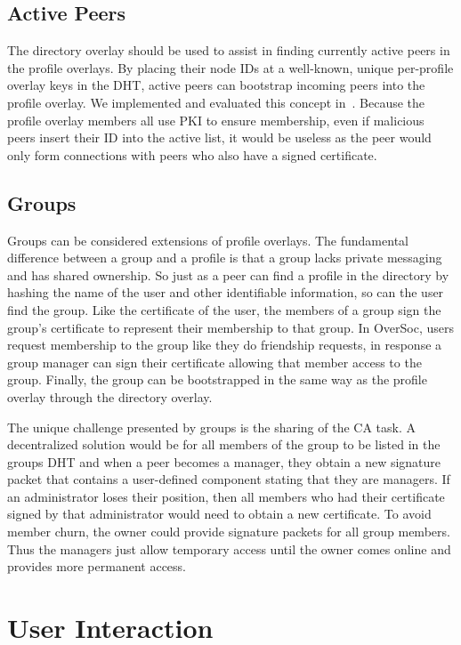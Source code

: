 \documentclass{IEEEtran}
\begin{document}
\subsection{Active Peers}

The directory overlay should be used to assist in finding currently active
peers in the profile overlays.  By placing their node IDs at a well-known,
unique per-profile overlay keys in the DHT, active peers can bootstrap
incoming peers into the profile overlay.  We implemented and evaluated this
concept in~\cite{vpo}.  Because the profile overlay members all use PKI to
ensure membership, even if malicious peers insert their ID into the active
list, it would be useless as the peer would only form connections with peers
who also have a signed certificate.

\subsection{Groups}

Groups can be considered extensions of profile overlays.  The fundamental
difference between a group and a profile is that a group lacks private
messaging and has shared ownership.  So just as a peer can find a profile in
the directory by hashing the name of the user and other identifiable
information, so can the user find the group.  Like the certificate of the user,
the members of a group sign the group's certificate to represent their
membership to that group.  In OverSoc, users request membership to the group
like they do friendship requests, in response a group manager can sign their
certificate allowing that member access to the group.  Finally, the group can
be bootstrapped in the same way as the profile overlay through the directory
overlay.

The unique challenge presented by groups is the sharing of the CA task.  A
decentralized solution would be for all members of the group to be listed in
the groups DHT and when a peer becomes a manager, they obtain a new signature
packet that contains a user-defined component stating that they are managers.
If an administrator loses their position, then all members who had their
certificate signed by that administrator would need to obtain a new
certificate.  To avoid member churn, the owner could provide signature packets
for all group members.  Thus the managers just allow temporary access until the
owner comes online and provides more permanent access.

\section{User Interaction}
\label{user_interaction}
\end{document}
